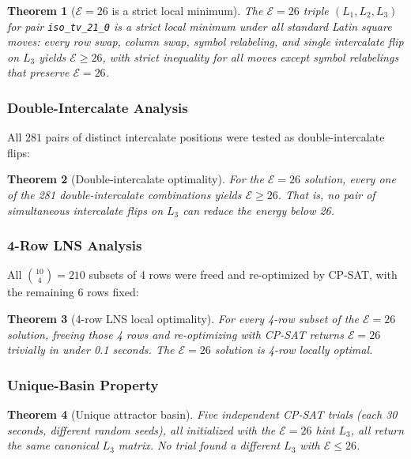 \documentclass[11pt,a4paper]{article}
\newtheorem{theorem}{Theorem}[section]
\theoremstyle{remark}
\newcommand{\E}{\mathcal{E}}
\begin{document}
\begin{theorem}[$\E=26$ is a strict local minimum]\label{thm:local_min}
The $\E=26$ triple $(L_1, L_2, L_3)$ for pair \texttt{iso\_tv\_21\_0} is a strict local
minimum under all standard Latin square moves: every row swap, column swap, symbol relabeling,
and single intercalate flip on $L_3$ yields $\E \geq 26$, with strict inequality for all
moves except symbol relabelings that preserve $\E=26$.
\end{theorem}

\subsubsection{Double-Intercalate Analysis}

All $281$ pairs of distinct intercalate positions were tested as double-intercalate flips:

\begin{theorem}[Double-intercalate optimality]\label{thm:double_ic}
For the $\E=26$ solution, every one of the 281 double-intercalate combinations yields
$\E \geq 26$. That is, no pair of simultaneous intercalate flips on $L_3$ can reduce the
energy below 26.
\end{theorem}

\subsubsection{4-Row LNS Analysis}

All $\binom{10}{4} = 210$ subsets of 4 rows were freed and re-optimized by CP-SAT, with
the remaining 6 rows fixed:

\begin{theorem}[4-row LNS local optimality]\label{thm:lns}
For every 4-row subset of the $\E=26$ solution, freeing those 4 rows and re-optimizing
with CP-SAT returns $\E=26$ trivially in under 0.1 seconds. The $\E=26$ solution is
4-row locally optimal.
\end{theorem}

\subsubsection{Unique-Basin Property}

\begin{theorem}[Unique attractor basin]\label{thm:unique_basin}
Five independent CP-SAT trials (each 30 seconds, different random seeds), all initialized
with the $\E=26$ hint $L_3$, all return the \emph{same canonical $L_3$} matrix. No trial
found a different $L_3$ with $\E \leq 26$.
\end{theorem}
\end{document}
